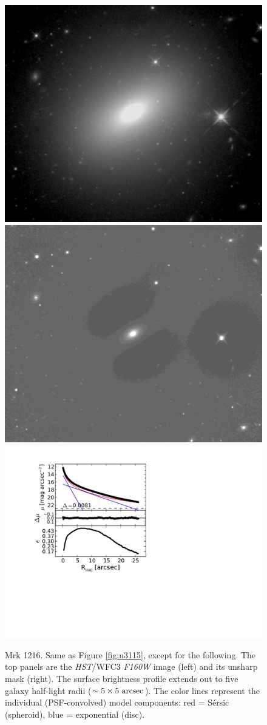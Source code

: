 \documentclass[useAMS,usenatbib,article]{mnras}
\begin{document}
\begin{figure}
\begin{center}
\includegraphics[width=0.49\columnwidth]{mrk1216_image.jpeg}
\includegraphics[width=0.49\columnwidth]{mrk1216_unsharp.jpeg} \\
\includegraphics[width=1.05\columnwidth]{mrk1216_decomposition.pdf}
\caption{Mrk 1216. 
Same as Figure \ref{fig:n3115}, except for the following. 
The top panels are the \emph{HST}/WFC3 \emph{F160W} image (left) and its unsharp mask (right).
The surface brightness profile extends out to five galaxy half-light radii ($\sim 5 \times 5~\rm arcsec$). 
The color lines represent the individual (PSF-convolved) model components:
red = S\'ersic (spheroid), blue = exponential (disc).
}
\label{fig:m1216}
\end{center}
\end{figure}
\end{document}
